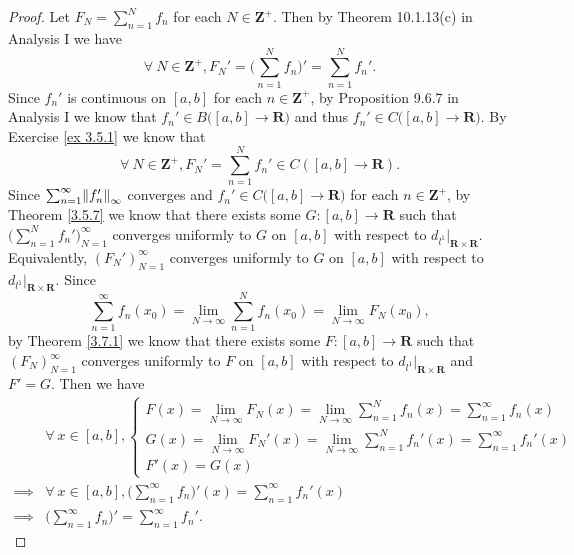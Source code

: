 \begin{proof}
    Let \(F_N = \sum_{n = 1}^N f_n\) for each \(N \in \mathbf{Z}^+\).
    Then by Theorem 10.1.13(c) in Analysis I we have
    \[
        \forall\ N \in \mathbf{Z}^+, F_N' = \bigg(\sum_{n = 1}^N f_n\bigg)' = \sum_{n = 1}^N f_n'.
    \]
    Since \(f_n'\) is continuous on \([a, b]\) for each \(n \in \mathbf{Z}^+\), by Proposition 9.6.7 in Analysis I we know that \(f_n' \in B\big([a, b] \to \mathbf{R}\big)\) and thus \(f_n' \in C\big([a, b] \to \mathbf{R}\big)\).
    By Exercise \ref{ex 3.5.1} we know that
    \[
        \forall\ N \in \mathbf{Z}^+, F_N' = \sum_{n = 1}^N f_n' \in C([a, b] \to \mathbf{R}).
    \]
    Since \(\sum_{n = 1}^\infty \norm*{f_n'}_\infty\) converges and \(f_n' \in C\big([a, b] \to \mathbf{R}\big)\) for each \(n \in \mathbf{Z}^+\), by Theorem \ref{3.5.7} we know that there exists some \(G : [a, b] \to \mathbf{R}\) such that \(\big(\sum_{n = 1}^N f_n'\big)_{N = 1}^\infty\) converges uniformly to \(G\) on \([a, b]\) with respect to \(d_{l^1}|_{\mathbf{R} \times \mathbf{R}}\).
    Equivalently, \((F_N')_{N = 1}^\infty\) converges uniformly to \(G\) on \([a, b]\) with respect to \(d_{l^1}|_{\mathbf{R} \times \mathbf{R}}\).
    Since
    \[
        \sum_{n = 1}^\infty f_n(x_0) = \lim_{N \to \infty} \sum_{n = 1}^N f_n(x_0) = \lim_{N \to \infty} F_N(x_0),
    \]
    by Theorem \ref{3.7.1} we know that there exists some \(F : [a, b] \to \mathbf{R}\) such that \((F_N)_{N = 1}^\infty\) converges uniformly to \(F\) on \([a, b]\) with respect to \(d_{l^1}|_{\mathbf{R} \times \mathbf{R}}\) and \(F' = G\).
    Then we have
    \begin{align*}
                 & \forall\ x \in [a, b], \begin{cases}
            F(x) = \lim_{N \to \infty} F_N(x) = \lim_{N \to \infty} \sum_{n = 1}^N f_n(x) = \sum_{n = 1}^\infty f_n(x)    \\
            G(x) = \lim_{N \to \infty} F_N'(x) = \lim_{N \to \infty} \sum_{n = 1}^N f_n'(x) = \sum_{n = 1}^\infty f_n'(x) \\
            F'(x) = G(x)
        \end{cases}                                             \\
        \implies & \forall\ x \in [a, b], \bigg(\sum_{n = 1}^\infty f_n\bigg)'(x) = \sum_{n = 1}^\infty f_n'(x) \\
        \implies & \bigg(\sum_{n = 1}^\infty f_n\bigg)' = \sum_{n = 1}^\infty f_n'.
    \end{align*}
\end{proof}

